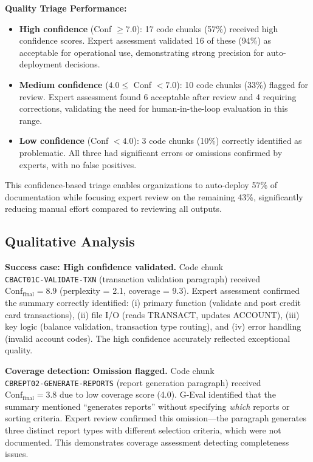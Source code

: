 \textbf{Quality Triage Performance:}
\begin{itemize}
    \item \textbf{High confidence} (Conf $\geq 7.0$): 17 code chunks (57\%) received high confidence scores. Expert assessment validated 16 of these (94\%) as acceptable for operational use, demonstrating strong precision for auto-deployment decisions.
    
    \item \textbf{Medium confidence} ($4.0 \leq$ Conf $< 7.0$): 10 code chunks (33\%) flagged for review. Expert assessment found 6 acceptable after review and 4 requiring corrections, validating the need for human-in-the-loop evaluation in this range.
    
    \item \textbf{Low confidence} (Conf $< 4.0$): 3 code chunks (10\%) correctly identified as problematic. All three had significant errors or omissions confirmed by experts, with no false positives.
\end{itemize}

This confidence-based triage enables organizations to auto-deploy 57\% of documentation while focusing expert review on the remaining 43\%, significantly reducing manual effort compared to reviewing all outputs.

\subsection{Qualitative Analysis}

\textbf{Success case: High confidence validated.} Code chunk \\\texttt{CBACT01C-VALIDATE-TXN} (transaction validation paragraph) received $\text{Conf}_{\text{final}} = 8.9$ (perplexity = 2.1, coverage = 9.3). Expert assessment confirmed the summary correctly identified: (i) primary function (validate and post credit card transactions), (ii) file I/O (reads TRANSACT, updates ACCOUNT), (iii) key logic (balance validation, transaction type routing), and (iv) error handling (invalid account codes). The high confidence accurately reflected exceptional quality.

\textbf{Coverage detection: Omission flagged.} Code chunk \\\texttt{CBREPT02-GENERATE-REPORTS} (report generation paragraph) received $\text{Conf}_{\text{final}} = 3.8$ due to low coverage score (4.0). G-Eval identified that the summary mentioned ``generates reports'' without specifying \textit{which} reports or sorting criteria. Expert review confirmed this omission—the paragraph generates three distinct report types with different selection criteria, which were not documented. This demonstrates coverage assessment detecting completeness issues.

